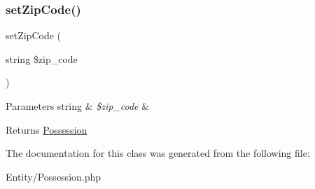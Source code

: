 \subsubsection{\texorpdfstring{setZipCode()}{setZipCode()}}
{\footnotesize\ttfamily set\+Zip\+Code (\begin{DoxyParamCaption}\item[{string}]{\$zip\+\_\+code }\end{DoxyParamCaption})}


\begin{DoxyParams}[1]{Parameters}
string & {\em \$zip\+\_\+code} & \\
\hline
\end{DoxyParams}
\begin{DoxyReturn}{Returns}
\mbox{\hyperlink{class_app_1_1_entity_1_1_possession}{Possession}} 
\end{DoxyReturn}


The documentation for this class was generated from the following file\+:\begin{DoxyCompactItemize}
\item 
Entity/Possession.\+php\end{DoxyCompactItemize}
